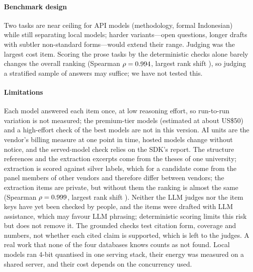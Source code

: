 \paragraph{Benchmark design} Two tasks are near ceiling for API models (methodology, formal Indonesian) while still separating local models; harder variants---open questions, longer drafts with subtler non-standard forms---would extend their range. Judging was the largest cost item. Scoring the prose tasks by the deterministic checks alone barely changes the overall ranking (Spearman $\rho=0.994{}$, largest rank shift \JudgeAutoShift{}), so judging a stratified sample of answers may suffice; we have not tested this.

\paragraph{Limitations} Each model answered each item once, at low reasoning effort, so run-to-run variation is not measured; the \NPremium{} premium-tier models (estimated at about US\$50) and a high-effort check of the best models are not in this version. AI units are the vendor's billing measure at one point in time, hosted models change without notice, and the served-model check relies on the SDK's report. The structure references and the extraction excerpts come from the theses of one university; extraction is scored against silver labels, which for a candidate come from the panel members of other vendors and therefore differ between vendors; the extraction items are private, but without them the ranking is almost the same (Spearman $\rho=0.999{}$, largest rank shift \PubMaxShift{}). Neither the LLM judges nor the item keys have yet been checked by people, and the items were drafted with LLM assistance, which may favour LLM phrasing; deterministic scoring limits this risk but does not remove it. The grounded checks test citation form, coverage and numbers, not whether each cited claim is supported, which is left to the judges. A real work that none of the four databases knows counts as not found. Local models ran 4-bit quantised in one serving stack, their energy was measured on a shared server, and their cost depends on the concurrency used.
